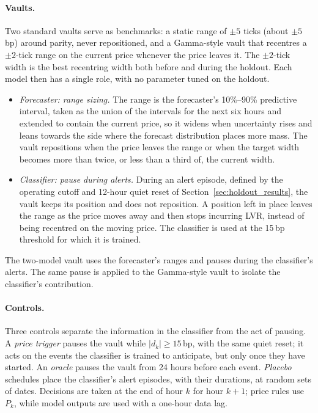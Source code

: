 \paragraph{Vaults.} Two standard vaults serve as benchmarks: a static range of $\pm5$ ticks (about
$\pm5$\,bp) around parity, never repositioned, and a Gamma-style vault that recentres a $\pm2$-tick range on
the current price whenever the price leaves it. The $\pm2$-tick width is the best recentring width both
before and during the holdout. Each model then has a single role, with no parameter tuned on the holdout.
\begin{itemize}
  \item \emph{Forecaster: range sizing.} The range is the forecaster's 10\%--90\% predictive interval, taken
        as the union of the intervals for the next six hours and extended to contain the current price, so it
        widens when uncertainty rises and leans towards the side where the forecast distribution places more
        mass. The vault repositions when the price leaves the range or when the target width becomes more than
        twice, or less than a third of, the current width.
  \item \emph{Classifier: pause during alerts.} During an alert episode, defined by the operating cutoff
        and 12-hour quiet reset of Section~\ref{sec:holdout_results}, the vault keeps its position and does
        not reposition. A position left in place leaves the range as the price moves away and then stops
        incurring LVR, instead of being recentred on the moving price. The classifier is used at the 15\,bp
        threshold for which it is trained.
\end{itemize}
The two-model vault uses the forecaster's ranges and pauses during the classifier's alerts. The same pause
is applied to the Gamma-style vault to isolate the classifier's contribution.

\paragraph{Controls.} Three controls separate the information in the classifier from the act of pausing. A
\emph{price trigger} pauses the vault while $|d_k|\ge15$\,bp, with the same quiet reset; it acts on the
events the classifier is trained to anticipate, but only once they have started. An \emph{oracle} pauses the
vault from 24 hours before each event. \emph{Placebo} schedules place the classifier's \lpEpisodes{} alert
episodes, with their durations, at \lpNPlacebo{} random sets of dates. Decisions are taken at the end of hour
$k$ for hour $k+1$; price rules use $P_k$, while model outputs are used with a one-hour data lag.

